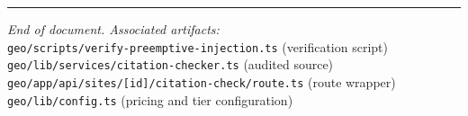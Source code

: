 \documentclass[11pt,letterpaper]{article}
\begin{document}
\vspace{1em}

\begin{center}
\rule{0.5\textwidth}{0.4pt}
\end{center}

\vspace{0.5em}

\begin{center}\small
\textit{End of document. Associated artifacts:}\\
\texttt{geo/scripts/verify-preemptive-injection.ts} (verification script)\\
\texttt{geo/lib/services/citation-checker.ts} (audited source)\\
\texttt{geo/app/api/sites/[id]/citation-check/route.ts} (route wrapper)\\
\texttt{geo/lib/config.ts} (pricing and tier configuration)
\end{center}
\end{document}
